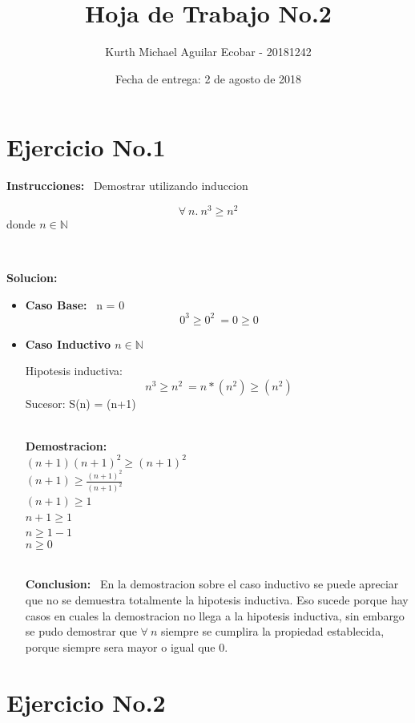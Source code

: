 \documentclass[10pt,a4paper]{article}
\begin{document}
\title{Hoja de Trabajo No.2}
\author{Kurth Michael Aguilar Ecobar - 20181242}
\date{Fecha de entrega: 2 de agosto de 2018}
\maketitle
\section*{Ejercicio No.1}
\begin{large}
\textbf{Instrucciones:} \ {Demostrar utilizando induccion}  
\end{large}
\[  
	\forall\ n.\ n^3\geq n^2
\]
donde $n\in\mathbb{N}$

\
\\\begin{large}
\textbf{Solucion:}
\end{large}

\begin{itemize}
\item \textbf{Caso Base:} \ n = 0
 \[ \ 0^{3}\geq 0^{2}\ = 0\geq 0 \]

\item \textbf{Caso Inductivo $n\in\mathbb{N}$}

 Hipotesis inductiva: \[
        \ n^3\geq n^2 \ = n*(n^2)\geq (n^2)
\]
 Sucesor: S(n) = (n+1) 
 
\
\\\textbf{Demostracion:}
\
\\ $ (n+1)(n+1)^2\geq (n+1)^2 $ 
\
\\ $ (n+1)\geq \frac{(n+1)^2}{(n+1)^2}$
\
\\ $ (n+1)\geq 1$
\
\\ $ n+1\geq 1 $
\
\\ $ n\geq 1-1 $
\
\\ $ n\geq 0 $ 

\
\\\textbf{Conclusion:}
\ En la demostracion sobre el caso inductivo se puede apreciar que no se demuestra totalmente la hipotesis inductiva. Eso sucede porque hay casos en cuales la demostracion no llega a la hipotesis inductiva, sin embargo se pudo demostrar que $ \forall\ n$ siempre se cumplira la propiedad establecida, porque siempre sera mayor o igual que 0. 



\end{itemize}

\section*{Ejercicio No.2}
\end{document}
